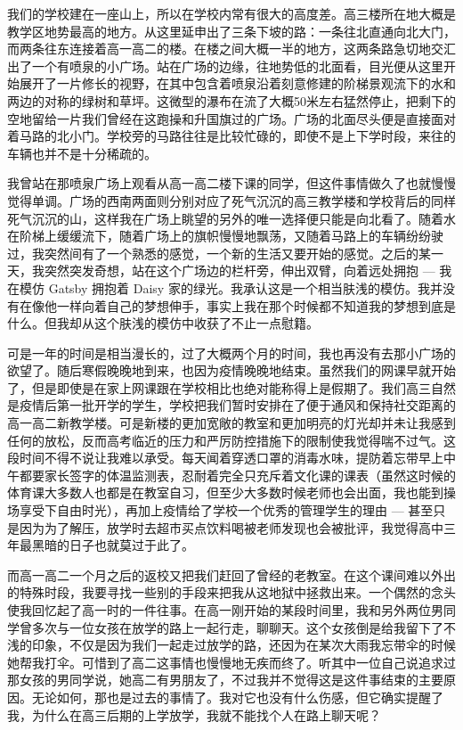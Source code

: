 \documentclass[UTF8,oneside]{ctexbook}
\begin{document}
我们的学校建在一座山上，所以在学校内常有很大的高度差。高三楼所在地大概是教学区地势最高的地方。从这里延申出了三条下坡的路：一条往北直通向北大门，而两条往东连接着高一高二的楼。在楼之间大概一半的地方，这两条路急切地交汇出了一个有喷泉的小广场。站在广场的边缘，往地势低的北面看，目光便从这里开始展开了一片修长的视野，在其中包含着喷泉沿着刻意修建的阶梯景观流下的水和两边的对称的绿树和草坪。这微型的瀑布在流了大概50米左右猛然停止，把剩下的空地留给一片我们曾经在这跑操和升国旗过的广场。广场的北面尽头便是直接面对着马路的北小门。学校旁的马路往往是比较忙碌的，即使不是上下学时段，来往的车辆也并不是十分稀疏的。

我曾站在那喷泉广场上观看从高一高二楼下课的同学，但这件事情做久了也就慢慢觉得单调。广场的西南两面则分别对应了死气沉沉的高三教学楼和学校背后的同样死气沉沉的山，这样我在广场上眺望的另外的唯一选择便只能是向北看了。随着水在阶梯上缓缓流下，随着广场上的旗帜慢慢地飘荡，又随着马路上的车辆纷纷驶过，我突然间有了一个熟悉的感觉，一个新的生活又要开始的感觉。之后的某一天，我突然突发奇想，站在这个广场边的栏杆旁，伸出双臂，向着远处拥抱 --- 我在模仿 Gatsby 拥抱着 Daisy 家的绿光。我承认这是一个相当肤浅的模仿。我并没有在像他一样向着自己的梦想伸手，事实上我在那个时候都不知道我的梦想到底是什么。但我却从这个肤浅的模仿中收获了不止一点慰籍。

可是一年的时间是相当漫长的，过了大概两个月的时间，我也再没有去那小广场的欲望了。随后寒假晚晚地到来，也因为疫情晚晚地结束。虽然我们的网课早就开始了，但是即使是在家上网课跟在学校相比也绝对能称得上是假期了。我们高三自然是疫情后第一批开学的学生，学校把我们暂时安排在了便于通风和保持社交距离的高一高二新教学楼。可是新楼的更加宽敞的教室和更加明亮的灯光却并未让我感到任何的放松，反而高考临近的压力和严厉防控措施下的限制使我觉得喘不过气。这段时间不得不说让我难以承受。每天闻着穿透口罩的消毒水味，提防着忘带早上中午都要家长签字的体温监测表，忍耐着完全只充斥着文化课的课表（虽然这时候的体育课大多数人也都是在教室自习，但至少大多数时候老师也会出面，我也能到操场享受下自由时光），再加上疫情给了学校一个优秀的管理学生的理由 --- 甚至只是因为为了解压，放学时去超市买点饮料喝被老师发现也会被批评，我觉得高中三年最黑暗的日子也就莫过于此了。

而高一高二一个月之后的返校又把我们赶回了曾经的老教室。在这个课间难以外出的特殊时段，我要寻找一些别的手段来把我从这地狱中拯救出来。一个偶然的念头使我回忆起了高一时的一件往事。在高一刚开始的某段时间里，我和另外两位男同学曾多次与一位女孩在放学的路上一起行走，聊聊天。这个女孩倒是给我留下了不浅的印象，不仅是因为我们一起走过放学的路，还因为在某次大雨我忘带伞的时候她帮我打伞。可惜到了高二这事情也慢慢地无疾而终了。听其中一位自己说追求过那女孩的男同学说，她高二有男朋友了，不过我并不觉得这是这件事结束的主要原因。无论如何，那也是过去的事情了。我对它也没有什么伤感，但它确实提醒了我，为什么在高三后期的上学放学，我就不能找个人在路上聊天呢？
\end{document}
